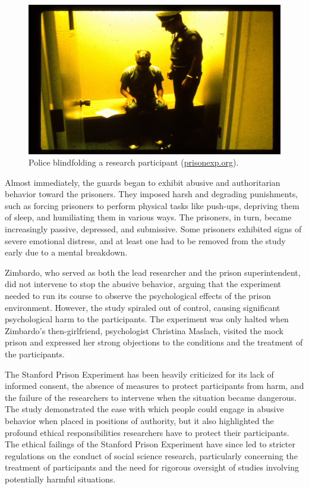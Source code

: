 \documentclass[
]{book}
\begin{document}
\begin{figure}
\centering
\includegraphics[width=1\textwidth,height=\textheight]{images/police-blindfolding.jpg}
\caption{Police blindfolding a research participant (\href{https://www.prisonexp.org/gallery}{prisonexp.org}).}
\end{figure}

Almost immediately, the guards began to exhibit abusive and authoritarian behavior toward the prisoners. They imposed harsh and degrading punishments, such as forcing prisoners to perform physical tasks like push-ups, depriving them of sleep, and humiliating them in various ways. The prisoners, in turn, became increasingly passive, depressed, and submissive. Some prisoners exhibited signs of severe emotional distress, and at least one had to be removed from the study early due to a mental breakdown.

Zimbardo, who served as both the lead researcher and the prison superintendent, did not intervene to stop the abusive behavior, arguing that the experiment needed to run its course to observe the psychological effects of the prison environment. However, the study spiraled out of control, causing significant psychological harm to the participants. The experiment was only halted when Zimbardo's then-girlfriend, psychologist Christina Maslach, visited the mock prison and expressed her strong objections to the conditions and the treatment of the participants.

The Stanford Prison Experiment has been heavily criticized for its lack of informed consent, the absence of measures to protect participants from harm, and the failure of the researchers to intervene when the situation became dangerous. The study demonstrated the ease with which people could engage in abusive behavior when placed in positions of authority, but it also highlighted the profound ethical responsibilities researchers have to protect their participants. The ethical failings of the Stanford Prison Experiment have since led to stricter regulations on the conduct of social science research, particularly concerning the treatment of participants and the need for rigorous oversight of studies involving potentially harmful situations.
\end{document}
